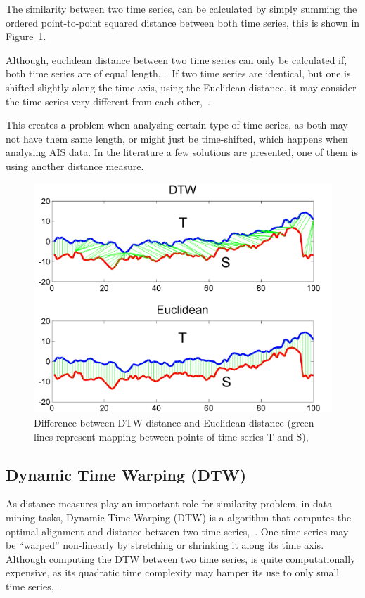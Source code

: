 The similarity between two time series, can be calculated by simply summing the ordered point-to-point squared distance between both time series, this is shown in Figure~\ref{fig:EuclidianDTW}. 

Although, euclidean distance between two time series can only be calculated if, both time series are of equal length,~\cite{EuclidianRef}. 
If two time series are identical, but one is shifted slightly along the time axis, using the Euclidean distance, it may consider the time series very different from each other,~\cite{Salvador2007}.

This creates a problem when analysing certain type of time series, as both may not have them same length, or might just be time-shifted, which happens when analysing AIS data. In the literature a few solutions are presented, one of them is using another distance measure. 

\begin{figure}[H]
	\centering
	\includegraphics[scale = .5]{figures/DTWEuclidean.png}
    \caption{Difference between DTW distance and Euclidean distance (green lines represent mapping between points of time series T and S),~\cite{EuclidianRef}}
    \label{fig:EuclidianDTW}
\end{figure}


\subsection{Dynamic Time Warping (DTW)}
As distance measures play an important role for similarity problem, in data mining tasks, Dynamic Time Warping (DTW) is a algorithm that computes the optimal alignment and distance between two time series,~\cite{Seto2015}. One time series may be “warped” non-linearly by stretching or shrinking it along its time axis. Although computing the DTW between two time series, is quite computationally expensive, as its quadratic time complexity may hamper its use to only small time series,~\cite{Salvador2007}. 